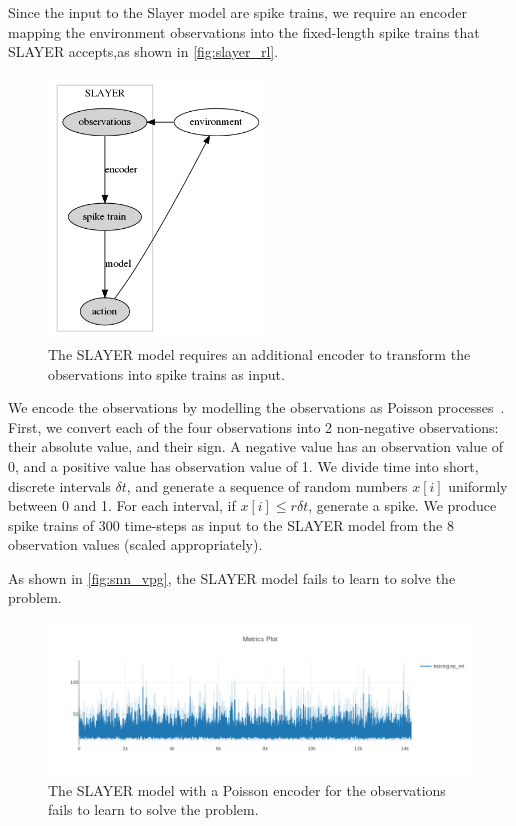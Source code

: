 \documentclass[fyp]{socreport}
\begin{document}
Since the input to the Slayer model are spike trains, we require an encoder
mapping the environment observations into the fixed-length spike trains that
SLAYER accepts,as shown in \autoref{fig:slayer_rl}.

\begin{figure}[htbp] \centering
\includegraphics[height=7cm]{images/snn_encode.png}
\caption{\label{fig:slayer_rl} The SLAYER model requires an additional encoder
to transform the observations into spike trains as input.}
\end{figure}

We encode the observations by modelling the observations as Poisson
processes~\cite{heeger2000poisson}. First, we convert each of the four
observations into 2 non-negative observations: their absolute value, and their
sign. A negative value has an observation value of 0, and a positive value has
observation value of 1. We divide time into short, discrete intervals
\(\delta t\), and generate a sequence of random numbers \(x[i]\) uniformly
between 0 and 1. For each interval, if \(x[i] \le r \delta t\), generate a
spike. We produce spike trains of 300 time-steps as input to the SLAYER model
from the 8 observation values (scaled appropriately).

As shown in \autoref{fig:snn_vpg}, the SLAYER model fails to learn to solve the
problem.

\begin{figure}[htbp] \centering
\includegraphics[width=.9\linewidth]{images/slayer_poisson.png}
\caption{\label{fig:snn_vpg} The SLAYER model with a Poisson encoder for the
observations fails to learn to solve the problem.}
\end{figure}
\end{document}
